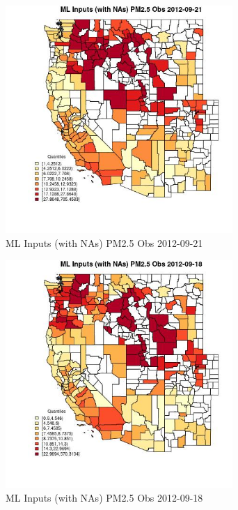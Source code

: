 \begin{figure} 
\centering  
\includegraphics[width=0.77\textwidth]{Code_Outputs/Report_ML_input_PM25_Step4_part_e_de_duplicated_aves_compiled_2019-05-14wNAs_CountyPM25_ObsMean2012-09-21_2012-09-21.jpg} 
\caption{\label{fig:Report_ML_input_PM25_Step4_part_e_de_duplicated_aves_compiled_2019-05-14wNAsCountyPM25_ObsMean2012-09-21_2012-09-21}ML Inputs (with NAs) PM2.5 Obs 2012-09-21} 
\end{figure} 
 

\begin{figure} 
\centering  
\includegraphics[width=0.77\textwidth]{Code_Outputs/Report_ML_input_PM25_Step4_part_e_de_duplicated_aves_compiled_2019-05-14wNAs_CountyPM25_ObsMean2012-09-18_2012-09-18.jpg} 
\caption{\label{fig:Report_ML_input_PM25_Step4_part_e_de_duplicated_aves_compiled_2019-05-14wNAsCountyPM25_ObsMean2012-09-18_2012-09-18}ML Inputs (with NAs) PM2.5 Obs 2012-09-18} 
\end{figure} 
 

